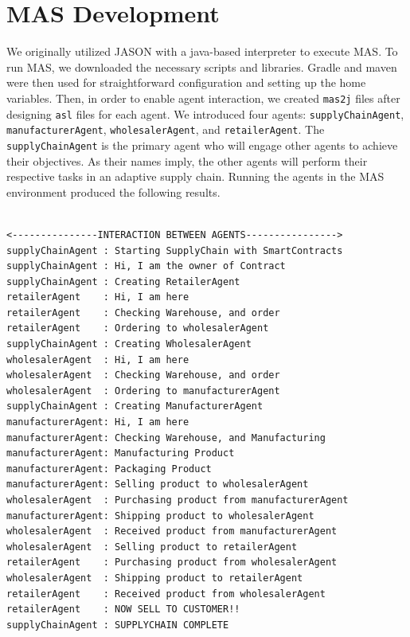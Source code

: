 \section{\ac{MAS} Development}

We originally utilized JASON with a java-based interpreter to execute \ac{MAS}. To run \ac{MAS}, we downloaded the necessary scripts and libraries. Gradle and maven were then used for straightforward configuration and setting up the home variables. Then, in order to enable agent interaction, we created \texttt{mas2j} files after designing \texttt{asl} files for each agent. We introduced four agents: \texttt{supplyChainAgent}, \texttt{manufacturerAgent}, \texttt{wholesalerAgent}, and \texttt{retailerAgent}. The \texttt{supplyChainAgent} is the primary agent who will engage other agents to achieve their objectives. As their names imply, the other agents will perform their respective tasks in an adaptive supply chain. Running the agents in the \ac{MAS} environment produced the following results.

\vspace{.5cm}

\begin{lstlisting}[numbers=none, basicstyle=\ttfamily\tiny]

<---------------INTERACTION BETWEEN AGENTS---------------->
supplyChainAgent : Starting SupplyChain with SmartContracts
supplyChainAgent : Hi, I am the owner of Contract
supplyChainAgent : Creating RetailerAgent
retailerAgent    : Hi, I am here
retailerAgent    : Checking Warehouse, and order
retailerAgent    : Ordering to wholesalerAgent
supplyChainAgent : Creating WholesalerAgent
wholesalerAgent  : Hi, I am here
wholesalerAgent  : Checking Warehouse, and order
wholesalerAgent  : Ordering to manufacturerAgent
supplyChainAgent : Creating ManufacturerAgent
manufacturerAgent: Hi, I am here
manufacturerAgent: Checking Warehouse, and Manufacturing
manufacturerAgent: Manufacturing Product
manufacturerAgent: Packaging Product
manufacturerAgent: Selling product to wholesalerAgent
wholesalerAgent  : Purchasing product from manufacturerAgent
manufacturerAgent: Shipping product to wholesalerAgent
wholesalerAgent  : Received product from manufacturerAgent
wholesalerAgent  : Selling product to retailerAgent
retailerAgent    : Purchasing product from wholesalerAgent
wholesalerAgent  : Shipping product to retailerAgent
retailerAgent    : Received product from wholesalerAgent
retailerAgent    : NOW SELL TO CUSTOMER!!
supplyChainAgent : SUPPLYCHAIN COMPLETE
\end{lstlisting}

